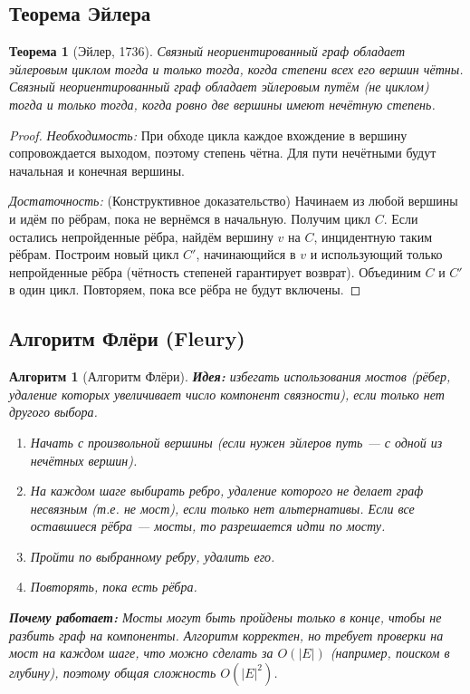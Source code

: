 \documentclass[12pt]{article}
\newtheorem{theorem}{Теорема}
\newtheorem{algorithm}{Алгоритм}
\begin{document}
\begin{enumerate}
\subsection{Теорема Эйлера}
\begin{theorem}[Эйлер, 1736]
    Связный неориентированный граф обладает эйлеровым циклом тогда и только тогда, когда степени всех его вершин чётны.
    Связный неориентированный граф обладает эйлеровым путём (не циклом) тогда и только тогда, когда ровно две вершины имеют нечётную степень.
\end{theorem}
\begin{proof}
    \textit{Необходимость:} При обходе цикла каждое вхождение в вершину сопровождается выходом, поэтому степень чётна. Для пути нечётными будут начальная и конечная вершины.
    
    \textit{Достаточность:} (Конструктивное доказательство) Начинаем из любой вершины и идём по рёбрам, пока не вернёмся в начальную. Получим цикл \(C\). Если остались непройденные рёбра, найдём вершину \(v\) на \(C\), инцидентную таким рёбрам. Построим новый цикл \(C'\), начинающийся в \(v\) и использующий только непройденные рёбра (чётность степеней гарантирует возврат). Объединим \(C\) и \(C'\) в один цикл. Повторяем, пока все рёбра не будут включены.
\end{proof}

\subsection{Алгоритм Флёри (Fleury)}
\begin{algorithm}[Алгоритм Флёри]
    \textbf{Идея:} избегать использования \textit{мостов} (рёбер, удаление которых увеличивает число компонент связности), если только нет другого выбора.
    \begin{enumerate}
        \item Начать с произвольной вершины (если нужен эйлеров путь — с одной из нечётных вершин).
        \item На каждом шаге выбирать ребро, удаление которого не делает граф несвязным (т.е. не мост), если только нет альтернативы. Если все оставшиеся рёбра — мосты, то разрешается идти по мосту.
        \item Пройти по выбранному ребру, удалить его.
        \item Повторять, пока есть рёбра.
    \end{enumerate}
    \textbf{Почему работает:} Мосты могут быть пройдены только в конце, чтобы не разбить граф на компоненты. Алгоритм корректен, но требует проверки на мост на каждом шаге, что можно сделать за \(O(|E|)\) (например, поиском в глубину), поэтому общая сложность \(O(|E|^2)\).
\end{algorithm}


\end{enumerate}
\end{document}
